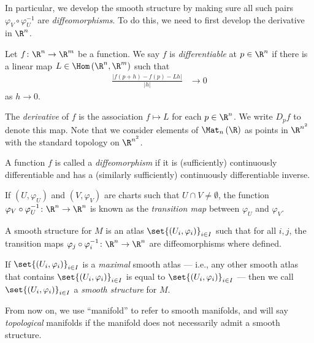 \documentclass[10pt]{mypackage}
\begin{document}
In particular, we develop the smooth structure by making sure all such pairs $\varphi_{V}\circ\varphi_U^{-1}$ are \textit{diffeomorphisms}. To do this, we need to first develop the derivative in $\R^n$.
\begin{definition}
  Let $f\colon \R^n\rightarrow \R^m$ be a function. We say $f$ is \textit{differentiable} at $p\in \R^n$ if there is a linear map $L\in \Hom\left( \R^n,\R^m \right)$ such that
  \begin{align*}
    \frac{\left\vert f\left( p+h \right)-f\left( p \right)-Lh \right\vert}{\left\vert h \right\vert} &\rightarrow 0
  \end{align*}
  as $h\rightarrow 0$.\newline

  The \textit{derivative} of $f$ is the association $f\mapsto L$ for each $p\in \R^n$. We write $D_pf$ to denote this map. Note that we consider elements of $\Mat_{n}\left( \R \right)$ as points in $\R^{n^2}$ with the standard topology on $\R^{n^2}$.\newline

  A function $f$ is called a \textit{diffeomorphism} if it is (sufficiently) continuously differentiable and has a (similarly sufficiently) continuously differentiable inverse.
\end{definition}
\begin{definition}
  If $\left( U,\varphi_U \right)$ and $\left( V,\varphi_V \right)$ are charts such that $U\cap V \neq \emptyset$, the function $\varphi_{V}\circ \varphi_{U}^{-1}\colon \R^n\rightarrow \R^n$ is known as the \textit{transition map} between $\varphi_U$ and $\varphi_V$.\newline

  A smooth structure for $M$ is an atlas $\set{\left( U_i,\varphi_i \right)}_{i\in I}$ such that for all $i,j$, the transition maps $\varphi_j\circ \varphi_i^{-1}\colon \R^n\rightarrow \R^n$ are diffeomorphisms where defined.\newline

  If $\set{\left( U_i,\varphi_i \right)}_{i\in I}$ is a \textit{maximal} smooth atlas --- i.e., any other smooth atlas that contains $\set{\left( U_i,\varphi_i \right)}_{i\in I}$ is equal to $\set{\left( U_i,\varphi_i \right)}_{i\in I}$ --- then we call $\set{\left( U_i,\varphi_i \right)}_{i\in I}$ a \textit{smooth structure} for $M$.
\end{definition}
\begin{note}
  From now on, we use ``manifold'' to refer to smooth manifolds, and will say \textit{topological} manifolds if the manifold does not necessarily admit a smooth structure.
\end{note}
\end{document}
